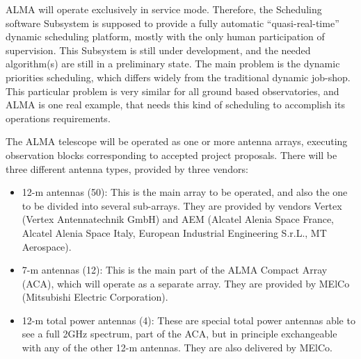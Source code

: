 \documentclass[11pt]{article}
\begin{document}
ALMA will operate exclusively in service mode. Therefore, the Scheduling software Subsystem is supposed to provide a fully automatic “quasi-real-time” dynamic scheduling platform, mostly with the only human participation of supervision. This Subsystem is still under development, and the needed algorithm(s) are still in a preliminary state. The main problem is the dynamic priorities scheduling, which differs widely from the traditional dynamic job-shop. This particular problem is very similar for all ground based observatories, and ALMA is one real example, that needs this kind of scheduling to accomplish its operations requirements.

The ALMA telescope will be operated as one or more antenna arrays, executing observation blocks corresponding to accepted project proposals. There will be three different antenna types, provided by three vendors:
\begin{itemize}
\item 12-m antennas (50): This is the main array to be operated, and also the one to be divided into several sub-arrays. They are provided by vendors Vertex (Vertex Antennatechnik GmbH) and AEM (Alcatel Alenia Space France, Alcatel Alenia Space Italy, European Industrial Engineering S.r.L., MT Aerospace).

\item 7-m antennas (12): This is the main part of the ALMA Compact Array (ACA), which will  operate as a separate array. They are provided by MElCo (Mitsubishi Electric Corporation).

\item 12-m total power antennas (4): These are special total power antennas able to see a full 2GHz spectrum, part of the ACA, but in principle exchangeable with any of the other 12-m antennas. They are also delivered by MElCo.

\end{itemize}
\end{document}

